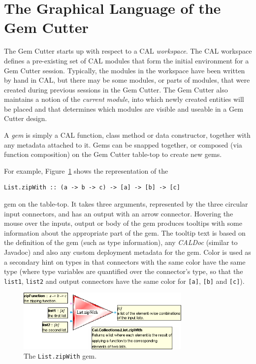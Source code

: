 \documentclass[preprint]{sigplanconf}
\begin{document}
\section{The Graphical Language of the Gem Cutter}
\label{sec:gemcutter}

The Gem Cutter starts up with respect to a CAL {\it workspace}. The CAL
workspace defines a pre-existing set of CAL modules that form the
initial environment for a Gem Cutter session. Typically, the modules
in the workspace have been written by hand in CAL, but there may be
some modules, or parts of modules, that were created during previous
sessions in the Gem Cutter. The Gem Cutter also maintains a
notion of the {\it current module}, into which newly created entities will
be placed and that determines which modules are visible and useable in
a Gem Cutter design.

A {\it gem} is simply a CAL function, class method or data constructor,
together with any metadata attached to it. Gems can be snapped
together, or composed (via function composition) on the Gem Cutter
table-top to create new gems.

For example, Figure~\ref{fig:zipWithFigure} shows the representation of
the
\begin{verbatim}
List.zipWith :: (a -> b -> c) -> [a] -> [b] -> [c]
\end{verbatim}
gem on the table-top. It takes three
arguments, represented by the three circular input connectors, and has
an output with an arrow connector. Hovering the mouse over the inputs,
output or body of the gem produces tooltips with some information
about the appropriate part of the gem. The tooltip text is based on
the definition of the gem (such as type information), any {\it CALDoc}
(similar to Javadoc) and also any custom deployment metadata for the
gem. Color is used as a secondary hint on types in that connectors
with the same color have the same type (where type variables are
quantified over the connector's type, so that the {\tt list1}, {\tt list2} and
output connectors have the same color for {\tt [a]}, {\tt [b]} and {\tt [c]}).

\begin{figure}[htb]
  \centering
  \includegraphics[width=20pc]{zipWithFigure.png}
  \caption{The {\tt List.zipWith} gem.}
  \label{fig:zipWithFigure}
\end{figure}
\end{document}
